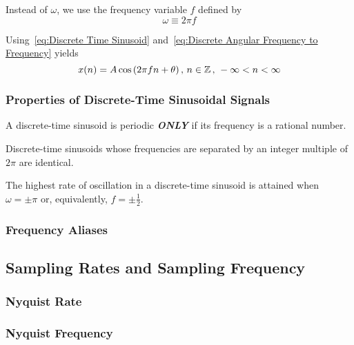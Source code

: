 Instead of $\omega$, we use the frequency variable $f$ defined by
\begin{equation}\label{eq:Discrete Angular Frequency to Frequency}
  \omega \equiv 2 \pi f
\end{equation}

Using~\eqref{eq:Discrete Time Sinusoid} and~\eqref{eq:Discrete Angular Frequency to Frequency} yields
\begin{equation}\label{eq:Discrete Frequency Sinusoid}
  x(n) = A \cos \left( 2 \pi fn + \theta \right) \text{, } n \in \operatorname{\mathbb{Z}} \text{, } -\infty < n < \infty
\end{equation}

\subsubsection{Properties of Discrete-Time Sinusoidal Signals}\label{subsubsec:Properties Discrete-Time Sinusoids}
\begin{propertylist}
\item A discrete-time sinusoid is periodic \textbf{\emph{ONLY}} if its frequency is a rational number.
\item Discrete-time sinusoids whose frequencies are separated by an integer multiple of $2\pi$ are identical.
\item The highest rate of oscillation in a discrete-time sinusoid is attained when $\omega = \pm \pi$ or, equivalently, $f= \pm \frac{1}{2}$.
\end{propertylist}

\subsubsection{Frequency Aliases}\label{subsubsec:Frequency Aliases}

\subsection{Sampling Rates and Sampling Frequency}\label{subsec:Sampling Rates and Frequency}
\subsubsection{Nyquist Rate}\label{subsubsec:Nyquist Rate}
\subsubsection{Nyquist Frequency}\label{subsubsec:Nyquist Frequency}

